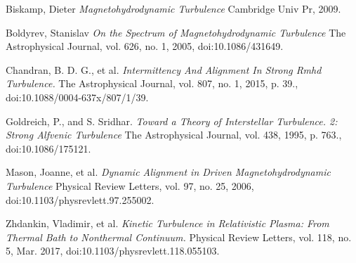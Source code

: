\documentclass[journal, a4paper]{IEEEtran}
\begin{document}
\begin{thebibliography}{9}

Biskamp, Dieter
\textit{Magnetohydrodynamic Turbulence}
Cambridge Univ Pr, 2009.
\vspace{.3cm}

Boldyrev, Stanislav
\textit{On the Spectrum of Magnetohydrodynamic Turbulence} 
The Astrophysical Journal, vol. 626, no. 1, 2005, doi:10.1086/431649.
\vspace{.3cm}

Chandran, B. D. G., et al. 
\textit{Intermittency And Alignment In Strong Rmhd Turbulence.} 
The Astrophysical Journal, vol. 807, no. 1, 2015, p. 39., doi:10.1088/0004-637x/807/1/39.
\vspace{.3cm}

Goldreich, P., and S. Sridhar.
\textit{Toward a Theory of Interstellar Turbulence. 2: Strong Alfvenic Turbulence} 
The Astrophysical Journal, vol. 438, 1995, p. 763., doi:10.1086/175121.
\vspace{.3cm}

Mason, Joanne, et al.
\textit{Dynamic Alignment in Driven Magnetohydrodynamic Turbulence}
Physical Review Letters, vol. 97, no. 25, 2006, doi:10.1103/physrevlett.97.255002.
\vspace{.3cm}

Zhdankin, Vladimir, et al.
\textit{Kinetic Turbulence in Relativistic Plasma: From Thermal Bath to Nonthermal Continuum.}
Physical Review Letters, vol. 118, no. 5, Mar. 2017, doi:10.1103/physrevlett.118.055103.



\end{thebibliography}
\end{document}

